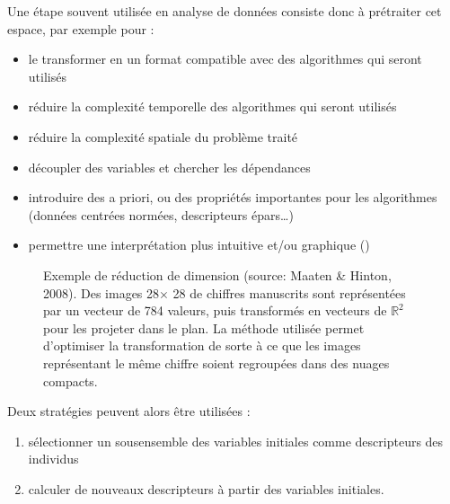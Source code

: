 \documentclass[letterpaper,10pt,english]{jupyterBook}
\begin{document}
\sphinxAtStartPar
Une étape souvent utilisée en analyse de données consiste donc à prétraiter cet espace, par exemple pour :
\begin{itemize}
\item {} 
\sphinxAtStartPar
le transformer en un format compatible avec des algorithmes qui seront utilisés

\item {} 
\sphinxAtStartPar
réduire la complexité temporelle des algorithmes qui seront utilisés

\item {} 
\sphinxAtStartPar
réduire la complexité spatiale du problème traité

\item {} 
\sphinxAtStartPar
découpler des variables et chercher les dépendances

\item {} 
\sphinxAtStartPar
introduire des a priori, ou des propriétés importantes pour les algorithmes (données centrées normées, descripteurs épars…)

\item {} 
\sphinxAtStartPar
permettre une interprétation plus intuitive et/ou graphique ({\hyperref[\detokenize{selection:tsne}]{}})

\end{itemize}

\begin{figure}[htbp]
\centering
\capstart

\noindent{}
\caption{Exemple de réduction de dimension (source: Maaten \& Hinton, 2008). Des images 28\(\times\) 28 de chiffres manuscrits sont représentées par un vecteur de 784 valeurs, puis transformés en vecteurs de \(\mathbb{R}^2\) pour les projeter dans le plan. La méthode utilisée permet d’optimiser la transformation de sorte à ce que les images représentant le même chiffre soient regroupées dans des nuages compacts.}\label{\detokenize{selection:tsne}}\end{figure}

\sphinxAtStartPar
Deux stratégies peuvent alors être utilisées :
\begin{enumerate}
%
\item {} 
\sphinxAtStartPar
sélectionner un sous\sphinxhyphen{}ensemble des variables initiales comme descripteurs des individus

\item {} 
\sphinxAtStartPar
calculer de nouveaux descripteurs à partir des variables initiales.

\end{enumerate}
\end{document}
